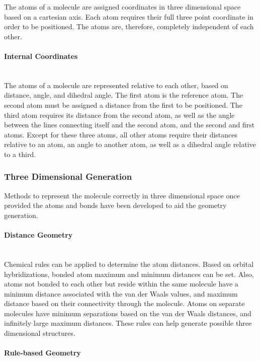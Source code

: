 \documentclass[12pt]{article}
\begin{document}
The atoms of a molecule are assigned coordinates in three dimensional space based on a cartesian axis. Each atom requires their full three point coordinate in order to be positioned. The atoms are, therefore, completely independent of each other.

\paragraph{Internal Coordinates}\mbox{}\\

The atoms of a molecule are represented relative to each other, based on distance, angle, and dihedral angle. The first atom is the reference atom. The second atom must be assigned a distance from the first to be positioned. The third atom requires its distance from the second atom, as well as the angle between the lines connecting itself and the second atom, and the second and first atoms. Except for these three atoms, all other atoms require their distances relative to an atom, an angle to another atom, as well as a dihedral angle relative to a third.

\subsubsection{Three Dimensional Generation}

Methods to represent the molecule correctly in three dimensional space once provided the atoms and bonds have been developed to aid the geometry generation. 

\paragraph{Distance Geometry}\mbox{}\\

Chemical rules can be applied to determine the atom distances. Based on orbital hybridizations, bonded atom maximum and minimum distances can be set. Also, atoms not bonded to each other but reside within the same molecule have a minimum distance associated with the van der Waals values, and maximum distance based on their connectivity through the molecule. Atoms on separate molecules have minimum separations based on the van der Waals distances, and infinitely large maximum distances. These rules can help generate possible three dimensional structures.

\paragraph{Rule-based Geometry}\mbox{}\\
\end{document}
